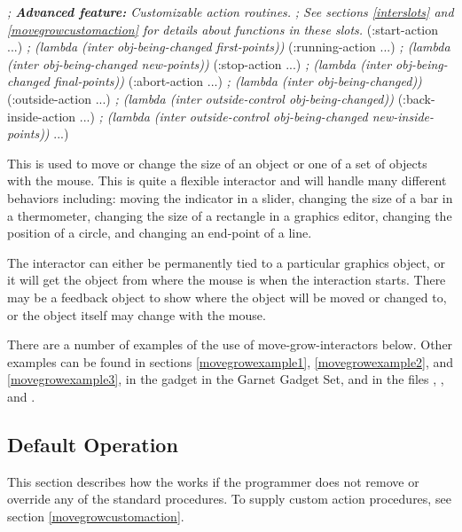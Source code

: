\begin{group}
\begin{programexample}
  {\it ; {\bf Advanced feature:} Customizable action routines.}
  {\it ; See sections \ref{interslots} and \ref{movegrowcustomaction} for details about functions in these slots.}
  (:start-action ...)       {\it ; (lambda (inter obj-being-changed first-points))}
  (:running-action ...)     {\it ; (lambda (inter obj-being-changed new-points))}
  (:stop-action ...)        {\it ; (lambda (inter obj-being-changed final-points))}
  (:abort-action ...)       {\it ; (lambda (inter obj-being-changed))}
  (:outside-action ...)     {\it ; (lambda (inter outside-control obj-being-changed))}
  (:back-inside-action ...) {\it ; (lambda (inter outside-control obj-being-changed new-inside-points))}
...)
\end{programexample}
\end{group}

This is used to move or change the size of an object or one of a set
of objects with the mouse.  This is quite a flexible interactor and
will handle many different behaviors including: moving the indicator
in a slider, changing the size of a bar in a thermometer, changing the
size of a rectangle in a graphics editor, changing the position of a
circle, and changing an end-point of a line.

The interactor can either be permanently tied to a particular graphics
object, or it will get the object from where the mouse is when the
interaction starts.  There may be a feedback object to show where the
object will be moved or changed to, or the object itself may change with
the mouse.

There are a number of examples of the use of move-grow-interactors
below.  Other
examples can be found in sections \ref{movegrowexample1},
\ref{movegrowexample2}, and \ref{movegrowexample3}, in
the  gadget in
the Garnet Gadget Set, and in the files ,
,  and .

\subsection{Default Operation}

This section describes how the  works
if the programmer does not remove or override any of the standard
 procedures.  To supply custom action procedures, see section
\ref{movegrowcustomaction}.

